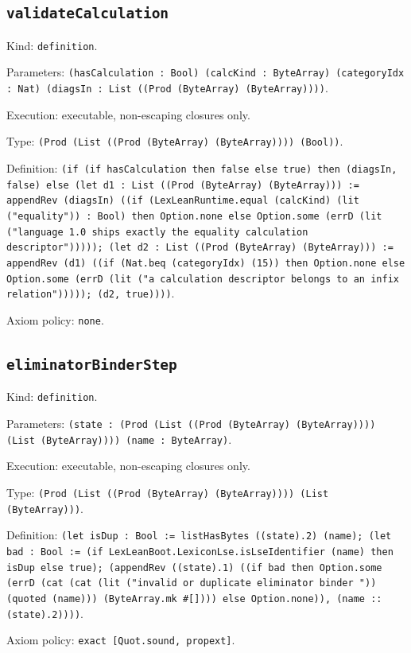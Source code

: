 \documentclass[11pt]{article}
\begin{document}
\subsection*{\texttt{validateCalculation}}
\noindent Kind: \texttt{definition}.\par
\noindent Parameters: \texttt{(hasCalculation : Bool) (calcKind : ByteArray) (categoryIdx : Nat) (diagsIn : List ((Prod (ByteArray) (ByteArray))))}.\par
\noindent Execution: executable, non-escaping closures only.\par
\noindent Type: \texttt{(Prod (List ((Prod (ByteArray) (ByteArray)))) (Bool))}.\par
\noindent Definition: \texttt{(if (if hasCalculation then false else true) then (diagsIn, false) else (let d1 : List ((Prod (ByteArray) (ByteArray))) := appendRev (diagsIn) ((if (LexLeanRuntime.equal (calcKind) (lit ("equality")) : Bool) then Option.none else Option.some (errD (lit ("language 1.0 ships exactly the equality calculation descriptor"))))); (let d2 : List ((Prod (ByteArray) (ByteArray))) := appendRev (d1) ((if (Nat.beq (categoryIdx) (15)) then Option.none else Option.some (errD (lit ("a calculation descriptor belongs to an infix relation"))))); (d2, true))))}.\par
\noindent Axiom policy: \texttt{none}.\par
\subsection*{\texttt{eliminatorBinderStep}}
\noindent Kind: \texttt{definition}.\par
\noindent Parameters: \texttt{(state : (Prod (List ((Prod (ByteArray) (ByteArray)))) (List (ByteArray)))) (name : ByteArray)}.\par
\noindent Execution: executable, non-escaping closures only.\par
\noindent Type: \texttt{(Prod (List ((Prod (ByteArray) (ByteArray)))) (List (ByteArray)))}.\par
\noindent Definition: \texttt{(let isDup : Bool := listHasBytes ((state).2) (name); (let bad : Bool := (if LexLeanBoot.LexiconLse.isLseIdentifier (name) then isDup else true); (appendRev ((state).1) ((if bad then Option.some (errD (cat (cat (lit ("invalid or duplicate eliminator binder ")) (quoted (name))) (ByteArray.mk \#[]))) else Option.none)), (name :: (state).2))))}.\par
\noindent Axiom policy: \texttt{exact [Quot.sound, propext]}.\par
\end{document}

